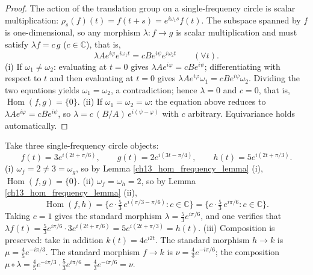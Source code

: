\begin{proof}
The action of the translation group on a single-frequency circle is scalar multiplication: $\rho_s(f)(t) = f(t+s) = e^{i\omega_1 s} f(t)$. The subspace spanned by $f$ is one-dimensional, so any morphism $\lambda: f \to g$ is scalar multiplication and must satisfy $\lambda f = c\, g$ ($c \in \mathbb{C}$), that is,
\[
\lambda A e^{i\varphi} e^{i\omega_1 t} = c B e^{i\psi} e^{i\omega_2 t} \qquad (\forall t).
\]
(i) If $\omega_1 \neq \omega_2$: evaluating at $t = 0$ gives $\lambda A e^{i\varphi} = c B e^{i\psi}$; differentiating with respect to $t$ and then evaluating at $t = 0$ gives $\lambda A e^{i\varphi} \omega_1 = c B e^{i\psi} \omega_2$. Dividing the two equations yields $\omega_1 = \omega_2$, a contradiction; hence $\lambda = 0$ and $c = 0$, that is, $\operatorname{Hom}(f, g) = \{0\}$.
(ii) If $\omega_1 = \omega_2 = \omega$: the equation above reduces to $\lambda A e^{i\varphi} = c B e^{i\psi}$, so $\lambda = c\,(B/A)\,e^{i(\psi-\varphi)}$ with $c$ arbitrary. Equivariance holds automatically.
\end{proof}

\begin{example}\label{ch13_hom_set_example}
Take three single-frequency circle objects:
\[
f(t) = 3 e^{i(2t + \pi/6)}, \qquad g(t) = 2 e^{i(3t - \pi/4)}, \qquad h(t) = 5 e^{i(2t + \pi/3)}.
\]
(i) $\omega_f = 2 \neq 3 = \omega_g$, so by Lemma \ref{ch13_hom_frequency_lemma} (i), $\operatorname{Hom}(f, g) = \{0\}$.
(ii) $\omega_f = \omega_h = 2$, so by Lemma \ref{ch13_hom_frequency_lemma} (ii),
\[
\operatorname{Hom}(f, h) = \Big\{ c \cdot \tfrac{5}{3}\, e^{i(\pi/3 - \pi/6)} : c \in \mathbb{C} \Big\} = \Big\{ c \cdot \tfrac{5}{3}\, e^{i\pi/6} : c \in \mathbb{C} \Big\}.
\]
Taking $c = 1$ gives the standard morphism $\lambda = \tfrac{5}{3} e^{i\pi/6}$, and one verifies that $\lambda f(t) = \tfrac{5}{3} e^{i\pi/6} \cdot 3 e^{i(2t + \pi/6)} = 5 e^{i(2t + \pi/3)} = h(t)$.
(iii) Composition is preserved: take in addition $k(t) = 4 e^{i 2t}$. The standard morphism $h \to k$ is $\mu = \tfrac{4}{5} e^{-i\pi/3}$. The standard morphism $f \to k$ is $\nu = \tfrac{4}{3} e^{-i\pi/6}$; the composition $\mu \circ \lambda = \tfrac{4}{5} e^{-i\pi/3} \cdot \tfrac{5}{3} e^{i\pi/6} = \tfrac{4}{3} e^{-i\pi/6} = \nu$.
\end{example}

